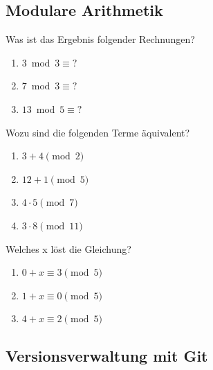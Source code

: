 \documentclass[11pt, a4paper]{article}
\begin{document}
\subsection{Modulare Arithmetik}
Was ist das Ergebnis folgender Rechnungen?
\begin{enumerate}
	\item $3 \bmod 3 \equiv \text{?}$
	\item $7 \bmod 3 \equiv \text{?}$
	\item $13 \bmod 5 \equiv \text{?}$
\end{enumerate}
Wozu sind die folgenden Terme äquivalent?
\begin{enumerate}
	\item $3 + 4 \pmod 2$
	\item $12 + 1 \pmod 5$
	\item $4 \cdot 5 \pmod 7$
	\item $3 \cdot 8 \pmod {11}$
\end{enumerate}
Welches x löst die Gleichung?
\begin{enumerate}
	\item $0 + x \equiv 3 \pmod 5$
	\item $1 + x \equiv 0 \pmod 5$
	\item $4 + x \equiv 2 \pmod 5$
\end{enumerate}

\subsection{Versionsverwaltung mit Git}
\end{document}
